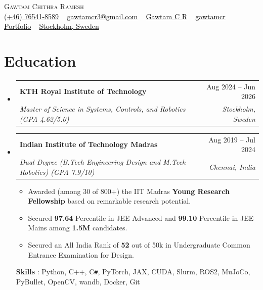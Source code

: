 \documentclass[letterpaper, 11pt]{article}
\makeatletter
\newcommand{\resumeSubheading}[4]{
\vspace{-2pt}
\item
\begin{tabular*}{1.0\textwidth}[t]{l@{\extracolsep{\fill}}r}
	\textbf{#1}       & {\small #2} \\
     [-2pt]
	\textit{{\small#3}} & \textit{\small #4} \\
\end{tabular*}
\vspace{-10pt}
}
\newcommand{\resumeSubHeadingListStart}{\begin{itemize}[leftmargin=0.0in, label={}]}
\newcommand{\resumeSubHeadingListEnd}{\end{itemize}\vspace{-1em}}
\makeatother
\begin{document}
\begin{center}
    {\Huge \scshape Gawtam Chithra Ramesh} \\
    \vspace{3pt}
    \small
    { \href{tel:+46764518589}{{\faMobile*} \textcolor{black}{(+46) 76541-8589}} ~
    \href{mailto:gawtamcr3@gmail.com}{{\faPaperPlane} \textcolor{black}{gawtamcr3@gmail.com}} ~
    \href{https://linkedin.com/in/gawtamcr/}{{\faLinkedinIn} \textcolor{black}{Gawtam C R}} ~
    \href{https://github.com/gawtamcr}{{\faGithub} \textcolor{black}{gawtamcr}} ~
    \href{https://gawtamcr.github.io/}{{\faGlobe} \textcolor{black}{Portfolio}} ~
    \href{https://maps.google.com/?q=Stockholm,Sweden}{{\faMapMarker*} \textcolor{black}{Stockholm, Sweden}}
    }
    \vspace{-8pt}
\end{center}

\section{\color{Blue}Education}
    \resumeSubHeadingListStart
    \resumeSubheading{KTH Royal Institute of Technology}{Aug 2024 -- Jun 2026}{Master of Science in Systems, Controls, and Robotics \textnormal{(GPA 4.62/5.0)}}{Stockholm, Sweden}
    \resumeSubheading{Indian Institute of Technology Madras}{Aug 2019 -- Jul 2024}{Dual Degree (B.Tech Engineering Design and M.Tech Robotics) \textnormal{(GPA 7.9/10)}}{Chennai, India}
    \vspace{-0.3em}
    \small{
    \begin{itemize}[leftmargin=0.15in]
        \setlength{\itemsep}{-0.3em}
        \item Awarded (among 30 of 800+) the IIT Madras \textbf{Young Research Fellowship} based on remarkable research potential.
        \item Secured \textbf{97.64} Percentile in JEE Advanced and \textbf{99.10} Percentile in JEE Mains among \textbf{1.5M} candidates.
        \item Secured an All India Rank of \textbf{52} out of 50k in Undergraduate Common Entrance Examination for Design.
    \end{itemize}
    }
    \vspace{-0.7em}
    \textbf{Skills} : Python, C++, C\texttt{\#}, PyTorch, JAX, CUDA, Slurm, ROS2, MuJoCo, PyBullet, OpenCV, wandb, Docker, Git
    \resumeSubHeadingListEnd

\end{document}
